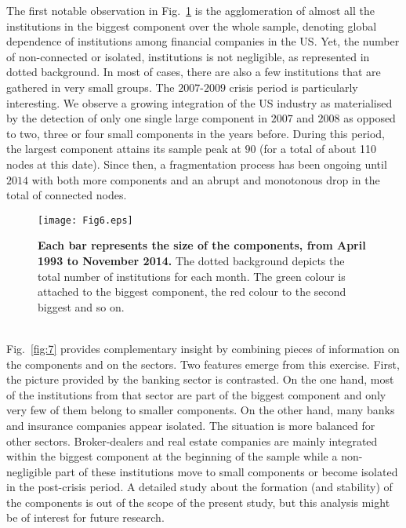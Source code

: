 \documentclass[a4paper,10pt]{article}
\begin{document}
The first notable observation in  Fig.~\ref{fig:6} is the agglomeration of almost all the institutions in the biggest
component over the whole sample, denoting global dependence of institutions among financial companies in the US. Yet, the 
number of non-connected  or isolated, institutions is not negligible, as represented in dotted background. In most of  cases,
there are also a few institutions that are gathered in very small groups. The $2007$-$2009$ crisis period is particularly 
interesting. We observe a growing integration of the US industry as materialised by the detection of only one single large 
component in $2007$ and $2008$ as opposed to two, three or four small components in the years before. During this period, 
the largest component attains its sample peak at $90$ (for a total of about 110 nodes at this date). Since then, a 
fragmentation process has been ongoing until $2014$ with both more components and an abrupt and monotonous drop in the total 
of connected nodes.
\begin{figure}[!h]
\texttt{[image: Fig6.eps]}
\caption{{\bf Each bar represents the size of the components, from April 1993 to November 2014.} The dotted background depicts the 
total number of institutions for each month. The green colour is attached to the biggest component, the red colour to the 
second biggest and so on.}
\label{fig:6}
\end{figure}
\\
Fig.~\ref{fig:7} provides complementary insight by combining pieces of information on the components and on the sectors. Two
features emerge from this exercise. First, the picture provided by the banking sector is contrasted. On the one hand, most of 
the institutions from that sector are part of the biggest component and only very few of them belong to smaller components. On
the other hand, many banks and insurance companies appear isolated. The situation is more balanced for other sectors. 
Broker-dealers and real estate companies are mainly integrated within the biggest component at the beginning of the sample 
while a non-negligible part of these institutions move to small components or become isolated in the post-crisis period. A 
detailed study about the formation (and stability) of the components is out of the scope of the present study, but this 
analysis might be of interest for future research.
\end{document}

